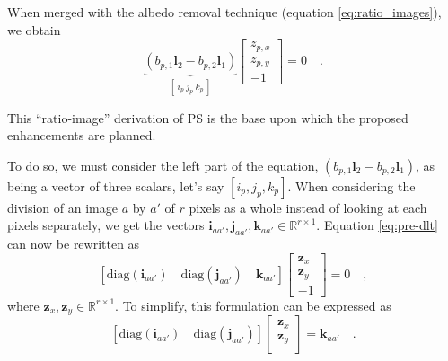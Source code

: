 When merged with the albedo removal technique (equation \eqref{eq:ratio_images}), we obtain
\begin{equation}
\label{eq:pre-dlt}
\underbrace{ \left( b_{p,1} \mathbf{l}_2 - b_{p,2} \mathbf{l}_1 \right) }_{ [ \ i_p \ j_p \ k_p \ ]}
\begin{bmatrix}
z_{p,x} \\
z_{p,y} \\
-1
\end{bmatrix}
= 0  \quad.
\end{equation}

This ``ratio-image'' derivation of PS is the base upon which the proposed enhancements are planned. %

To do so, we must consider the left part of the equation, $\left( b_{p,1} \mathbf{l}_2 - b_{p,2} \mathbf{l}_1 \right)$, as being a vector of three scalars, let's say $\left[ i_p, j_p, k_p \right]$. When considering the division of an image $a$ by $a'$ of $r$ pixels as a whole instead of looking at each pixels separately, we get the vectors $\mathbf{i}_{aa'}, \mathbf{j}_{aa'}, \mathbf{k}_{aa'} \in \mathbb{R}^{ r \times 1 }$. Equation \eqref{eq:pre-dlt} can now be rewritten as
\begin{equation}
\left[ \mathrm{diag}(\mathbf{i}_{aa'}) \quad \mathrm{diag}(\mathbf{j}_{aa'}) \quad \mathbf{k}_{aa'}\right]
\begin{bmatrix}
\mathbf{z}_{x} \\
\mathbf{z}_{y} \\
-1
\end{bmatrix}
= 0 \quad,
\end{equation}
where $\mathbf{z}_{x}, \mathbf{z}_{y} \in \mathbb{R}^{ r \times 1 }$.
To simplify, this formulation can be expressed as
\begin{equation}
\label{eq:diagdlt}
\left[ \mathrm{diag}(\mathbf{i}_{aa'}) \quad \mathrm{diag}(\mathbf{j}_{aa'}) \right]
\begin{bmatrix}
\mathbf{z}_{x} \\
\mathbf{z}_{y} \\
\end{bmatrix}
= \mathbf{k}_{aa'} \quad.
\end{equation}

